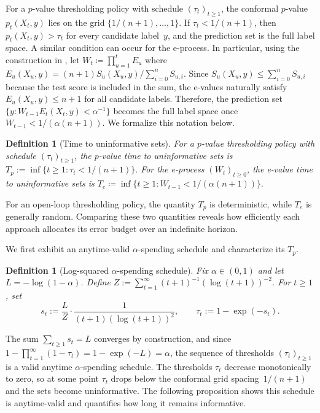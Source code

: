 \documentclass{uai2026} %
\newtheorem{definition}[theorem]{Definition}
\newcommand{\1}{\mathbf{1}}
\newcommand{\eqdef}{\coloneqq}
\begin{document}
For a $p$-value thresholding policy with schedule $(\tau_t)_{t \ge 1}$, the conformal $p$-value $p_t(X_t, y)$ lies on the grid $\{1/(n{+}1), \ldots, 1\}$.
If $\tau_t < 1/(n{+}1)$, then $p_t(X_t, y) > \tau_t$ for every candidate label~$y$, and the prediction set is the full label space.
A similar condition can occur for the e-process. In particular, using the construction in \citet{gauthier2025values}, let $W_t \eqdef
\prod_{u=1}^t E_u$ where $E_u(X_u, y) = (n+1) S_{u}(X_u, y) / \sum_{i=0}^n S_{u,i}$. Since $S_{u}(X_u, y) \le \sum_{i=0}^n S_{u,i}$ because the test score is included in the sum, the e-values naturally satisfy $E_u(X_u,y) \le n+1$ for all candidate labels. Therefore, the prediction set $\{y : W_{t-1} E_t(X_t, y) < \alpha^{-1}\}$ becomes the full label space once $W_{t-1} < 1/(\alpha(n{+}1))$. We formalize this notation below.

\begin{definition}[Time to uninformative sets]
  \label{def:time-uninformative}
  For a $p$-value thresholding policy with schedule $(\tau_t)_{t \ge 1}$, the \emph{$p$-value time to uninformative sets} is $T_p := \inf\{t \ge 1 : \tau_t < 1/(n{+}1)\}.$
  For the e-process $(W_t)_{t \ge 0}$, the \emph{e-value time to uninformative sets} is $T_e \eqdef
  \inf\{t \ge 1 : W_{t-1} < 1/(\alpha(n{+}1))\}.$
\end{definition}

For an open-loop thresholding policy, the quantity $T_p$ is deterministic, while $T_e$ is generally random. Comparing these two quantities reveals how efficiently each approach allocates its error budget over an indefinite horizon.

We first exhibit an anytime-valid $\alpha$-spending schedule and characterize its $T_p$.

\begin{definition}[Log-squared $\alpha$-spending schedule]
  \label{def:log2-spending}
  Fix $\alpha\in(0,1)$ and let $L = -\log(1-\alpha)$.
  Define $Z := \sum_{t=1}^{\infty} (t{+}1)^{-1}(\log(t{+}1))^{-2}$.
  For $t \ge 1$, set
  \begin{equation*}
    s_t := \frac{L}{Z} \cdot \frac{1}{(t{+}1)(\log(t{+}1))^2},
    \qquad
    \tau_t := 1 - \exp(-s_t).
  \end{equation*}
\end{definition}

The sum $\sum_{t \ge 1} s_t = L$ converges by construction, and since $1 - \prod_{t=1}^\infty (1-\tau_t) = 1 - \exp(-L) = \alpha$, the sequence of thresholds $(\tau_t)_{t \ge 1}$ is a valid anytime $\alpha$-spending schedule.
The thresholds $\tau_t$ decrease monotonically to zero, so at some point $\tau_t$ drops below the conformal grid spacing~$1/(n{+}1)$ and the sets become uninformative.
The following proposition shows this schedule is anytime-valid and quantifies how long it remains informative.
\end{document}
